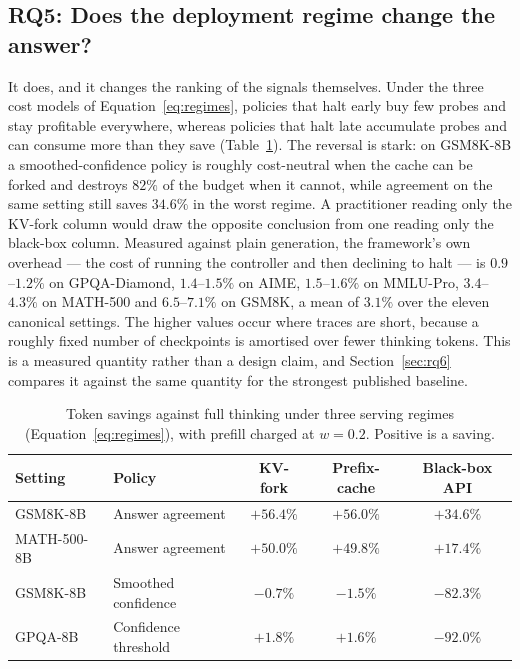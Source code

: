 \documentclass[acmsmall]{acmart}
\newcommand{\up}[1]{\textcolor{gd}{#1}}
\newcommand{\dn}[1]{\textcolor{bd}{#1}}
\theoremstyle{acmdefinition}%
\theoremstyle{acmplain}}{}%
\begin{document}
\subsection{RQ5: Does the deployment regime change the answer?}\label{sec:rq5}
It does, and it changes the ranking of the signals themselves. Under the three cost models of Equation~\eqref{eq:regimes}, policies that halt early buy few probes and stay profitable everywhere, whereas policies that halt late accumulate probes and can consume more than they save (Table~\ref{tab:regimes}). The reversal is stark: on GSM8K-8B a smoothed-confidence policy is roughly cost-neutral when the cache can be forked and destroys $82\%$ of the budget when it cannot, while agreement on the same setting still saves $34.6\%$ in the worst regime. A practitioner reading only the KV-fork column would draw the opposite conclusion from one reading only the black-box column. Measured against plain generation, the framework's own overhead --- the cost of running the controller and then declining to halt --- is $0.9$--$1.2\%$ on GPQA-Diamond, $1.4$--$1.5\%$ on AIME, $1.5$--$1.6\%$ on MMLU-Pro, $3.4$--$4.3\%$ on MATH-500 and $6.5$--$7.1\%$ on GSM8K, a mean of $3.1\%$ over the eleven canonical settings. The higher values occur where traces are short, because a roughly fixed number of checkpoints is amortised over fewer thinking tokens. This is a measured quantity rather than a design claim, and Section~\ref{sec:rq6} compares it against the same quantity for the strongest published baseline.



\begin{table}[t]
\caption{Token savings against full thinking under three serving regimes (Equation~\eqref{eq:regimes}), with prefill charged at $w=0.2$. Positive is a saving.}
\label{tab:regimes}
\small
\begin{tabular}{@{}llccc@{}}
\toprule
\textbf{Setting} & \textbf{Policy} & \textbf{KV-fork} & \textbf{Prefix-cache} & \textbf{Black-box API} \\
\midrule
GSM8K-8B     & Answer agreement     & $+56.4\%$ & $+56.0\%$ & \up{$+34.6\%$} \\
MATH-500-8B  & Answer agreement     & $+50.0\%$ & $+49.8\%$ & \up{$+17.4\%$} \\
GSM8K-8B     & Smoothed confidence  & $-0.7\%$  & $-1.5\%$  & \dn{$-82.3\%$} \\
GPQA-8B      & Confidence threshold & $+1.8\%$  & $+1.6\%$  & \dn{$-92.0\%$} \\
\bottomrule
\end{tabular}
\end{table}
\end{document}
